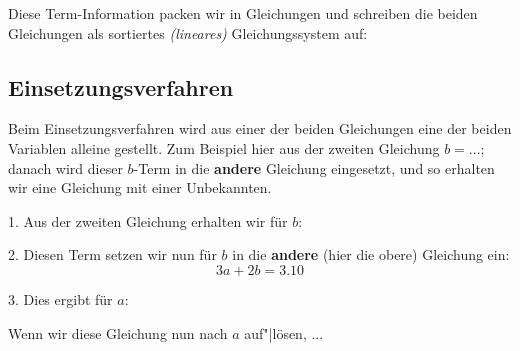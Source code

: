 
Diese Term-Information packen wir in Gleichungen und schreiben die
beiden Gleichungen als sortiertes \textit{(lineares)} Gleichungssystem auf:



\subsection{Einsetzungsverfahren}\label{einsetzungsverfahren}
Beim Einsetzungsverfahren wird aus einer der beiden Gleichungen eine der beiden Variablen alleine gestellt. Zum Beispiel hier aus der zweiten Gleichung $b = ...$; danach wird dieser $b$-Term in die \textbf{andere} Gleichung eingesetzt, und so erhalten wir eine Gleichung mit einer Unbekannten.





1. Aus der zweiten Gleichung erhalten wir für $b$:


2. Diesen Term setzen wir nun für $b$ in die \textbf{andere} (hier die obere) Gleichung ein:
$$3a+2b = 3.10$$

3. Dies ergibt für $a$:


Wenn wir diese Gleichung nun nach $a$ auf"|lösen, ...


